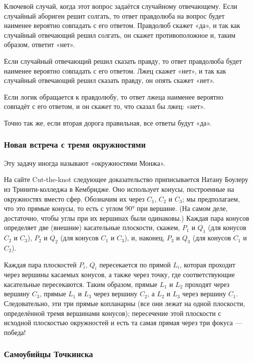 Ключевой случай, когда этот вопрос задаётся случайному отвечающему.
Если случайный абориген решит солгать, то ответ правдолюба на вопрос будет наименее вероятно совпадать с его ответом.
Правдолюб скажет «да», и так как случайный отвечающий решил солгать, он скажет противоположное и, таким образом, ответит «нет».

Если случайный отвечающий решил сказать правду, то ответ правдолюба будет наименее вероятно совпадать с его ответом.
Лжец скажет «нет», и так как случайный отвечающий решил сказать правду, он опять скажет «нет».

Если логик обращается к правдолюбу, то ответ лжеца наименее вероятно совпадёт с его ответом,
и он скажет то, что сказал бы лжец: «нет».

Точно так же, если вторая дорога правильная, все ответы будут «да».

\subsubsection*{Новая встреча с тремя окружностями}

Эту задачу иногда называют «окружностями Монжа».

На сайте Cut-the-knot следующее доказательство приписывается Натану Боулеру из Тринити-колледжа в Кембридже.
Оно использует конусы, построенные на окружностях вместо сфер.
Обозначим их через $C_1$, $C_2$ и $C_3$; мы предполагаем, что это прямые конусы, то есть с углом 90° при вершине.
(На самом деле, достаточно, чтобы углы при их вершинах были одинаковы.)
Каждая пара конусов определяет две (внешние) касательные плоскости, скажем, $P_1$ и $Q_1$ (для конусов $C_2$ и $C_3$), $P_2$ и $Q_2$ (для конусов $C_1$ и $C_3$), и, наконец, $P_3$ и $Q_3$ (для конусов $C_1$ и $C_2$).

Каждая пара плоскостей $P_i$, $Q_i$ пересекается по прямой $L_i$, которая проходит через вершины касаемых конусов, а также через точку, где соответствующие касательные пересекаются.
Таким образом, прямые $L_1$ и $L_2$ проходят через вершину $C_3$,
прямые $L_1$ и $L_3$ через вершину $C_2$,
а $L_2$ и $L_3$ через вершину $C_1$.
Следовательно, эти три прямые копланарны (все они лежат на одной плоскости, определённой тремя вершинами конусов); пересечение этой плоскости с исходной плоскостью окружностей и есть та самая прямая через три фокуса --- победа!

\subsubsection*{Самоубийцы Точкинска}

